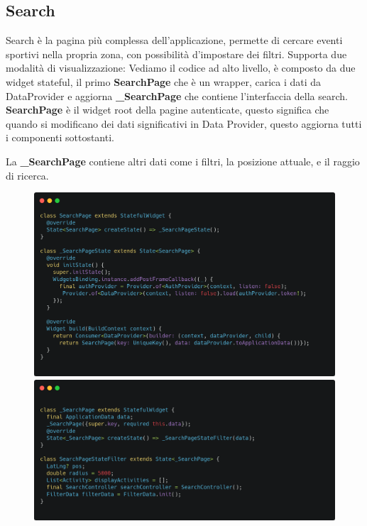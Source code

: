 \documentclass[a4paper,12pt]{article}
\begin{document}
\begin{figure}[H]
\begin{minipage}{0.40\textwidth}
    \end{minipage}
\end{figure}



\subsection{Search}
\label{sec:search}

Search è la pagina più complessa dell'applicazione, permette di cercare eventi sportivi nella propria zona, con possibilità d'impostare dei filtri. Supporta due modalità di visualizzazione: Vediamo il codice ad alto livello, è composto da due widget stateful, il primo \textbf{SearchPage} che è un wrapper, carica i dati da DataProvider e aggiorna \textbf{\_SearchPage} che contiene l'interfaccia della search.
\textbf{SearchPage} è il widget root della pagine autenticate, questo significa che quando si modificano dei dati significativi in Data Provider, questo aggiorna tutti i componenti sottostanti.

La \textbf{\_SearchPage} contiene altri dati come i filtri, la posizione attuale, e il raggio di ricerca.

\begin{figure}[H]
    \begin{minipage}{0.49\textwidth}
        \centering
        \includegraphics[width=1\linewidth]{img/search_page.png}
    \end{minipage}\hfill
    \begin{minipage}{0.49\textwidth}
        \centering
        \includegraphics[width=1\linewidth]{img/search_state.png}
    \end{minipage}
\end{figure}
\end{document}
